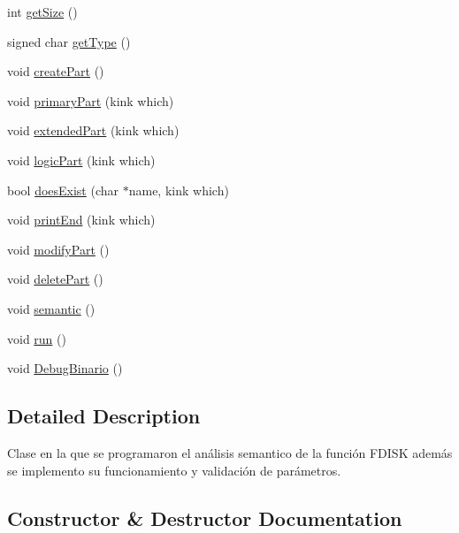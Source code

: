 \begin{DoxyCompactItemize}
int \hyperlink{classFDISK___a36811336ad11d30c712b2a9760286087}{get\+Size} ()
\item 
signed char \hyperlink{classFDISK___a7e5bbf0438a218aabb09bea7dfb2f9ef}{get\+Type} ()
\item 
void \hyperlink{classFDISK___a1d030793b942f70d9cde1d7bd7a2bb36}{create\+Part} ()
\item 
void \hyperlink{classFDISK___a34427ce807ae61a1e0b101bb2a69b581}{primary\+Part} (kink which)
\item 
void \hyperlink{classFDISK___a03f9fa267b7bdf7b2dda3aa13cfc960d}{extended\+Part} (kink which)
\item 
void \hyperlink{classFDISK___aabd69e0175b1950638c51ccf26cb0dcb}{logic\+Part} (kink which)
\item 
bool \hyperlink{classFDISK___a93bf6bebd83704cc477d365c52e78cca}{does\+Exist} (char $\ast$name, kink which)
\item 
void \hyperlink{classFDISK___a48abd8fe6a02cabd370e02a2b87164a3}{print\+End} (kink which)
\item 
void \hyperlink{classFDISK___a926ec9e4cadf17773cc630e0423af3db}{modify\+Part} ()
\item 
void \hyperlink{classFDISK___ac066192fc5d768882f553a802e34a1fd}{delete\+Part} ()
\item 
void \hyperlink{classFDISK___a3cabb04c96798f42985d7c199ba1987f}{semantic} ()
\item 
void \hyperlink{classFDISK___a00c4753fc48745eaf7b9fab40e864a94}{run} ()
\item 
void \hyperlink{classFDISK___ac3a1b362131afe438a0cfcd55d24fb24}{Debug\+Binario} ()
\end{DoxyCompactItemize}


\subsection{Detailed Description}
Clase en la que se programaron el análisis semantico de la función F\+D\+I\+SK además se implemento su funcionamiento y validación de parámetros. 

\subsection{Constructor \& Destructor Documentation}
\mbox{\label{classFDISK___a418b57a089062accc33338bcbb9daec4}} 
